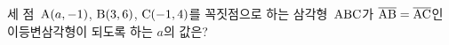 세 점~$\mathrm{A}(a{,}\mkern3mu\mathopen{}-1)$, $\mathrm{B}(3{,}\mkern3mu\mathopen{}6)$, $\mathrm{C}(-1{,}\mkern3mu\mathopen{}4)$를 꼭짓점으로 하는 삼각형~$\mathrm{ABC}$가 $\overline{\mathrm{AB}}=\overline{\mathrm{AC}}$인 이등변삼각형이 되도록 하는 $a$의 값은?
